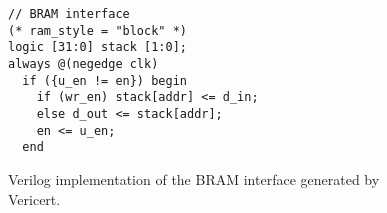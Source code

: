
\begin{figure}
  \centering
  \begin{minipage}{6cm}
\begin{verbatim}
// BRAM interface
(* ram_style = "block" *)
logic [31:0] stack [1:0];
always @(negedge clk)
  if ({u_en != en}) begin
    if (wr_en) stack[addr] <= d_in;
    else d_out <= stack[addr];
    en <= u_en;
  end
\end{verbatim}
  \end{minipage}
  \caption{Verilog implementation of the BRAM interface generated by Vericert.}
  \label{fig:hg:bram-interface}
\end{figure}

